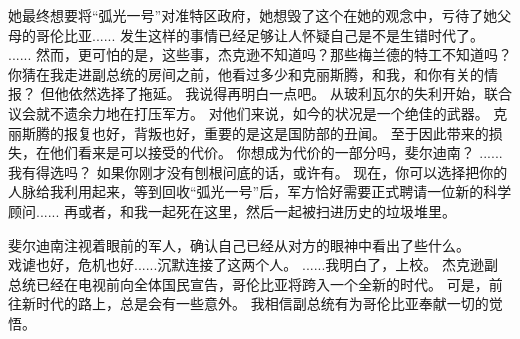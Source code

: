 \documentclass[openany]{book}
\begin{document}
\begin{dialogue}
     她最终想要将“弧光一号”对准特区政府，她想毁了这个在她的观念中，亏待了她父母的哥伦比亚......
     发生这样的事情已经足够让人怀疑自己是不是生错时代了。
     ......
     然而，更可怕的是，这些事，杰克逊不知道吗？那些梅兰德的特工不知道吗？
     你猜在我走进副总统的房间之前，他看过多少和克丽斯腾，和我，和你有关的情报？
     但他依然选择了拖延。
     我说得再明白一点吧。
     从玻利瓦尔的失利开始，联合议会就不遗余力地在打压军方。
     对他们来说，如今的状况是一个绝佳的武器。
     克丽斯腾的报复也好，背叛也好，重要的是这是国防部的丑闻。
     至于因此带来的损失，在他们看来是可以接受的代价。
     你想成为代价的一部分吗，斐尔迪南？
     ......我有得选吗？
     如果你刚才没有刨根问底的话，或许有。
     现在，你可以选择把你的人脉给我利用起来，等到回收“弧光一号”后，军方恰好需要正式聘请一位新的科学顾问......
     再或者，和我一起死在这里，然后一起被扫进历史的垃圾堆里。\par
    斐尔迪南注视着眼前的军人，确认自己已经从对方的眼神中看出了些什么。\\
    戏谑也好，危机也好......沉默连接了这两个人。
     ......我明白了，上校。
     杰克逊副总统已经在电视前向全体国民宣告，哥伦比亚将跨入一个全新的时代。
     可是，前往新时代的路上，总是会有一些意外。
     我相信副总统有为哥伦比亚奉献一切的觉悟。
\end{dialogue}
\end{document}

